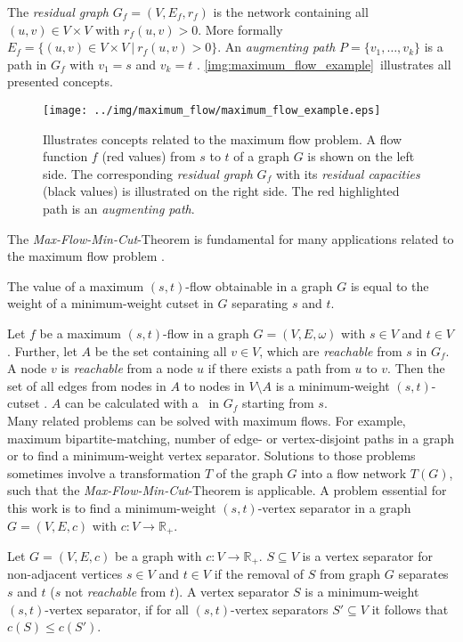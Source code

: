 The \emph{residual graph} $G_f = (V,E_f,r_f)$ is the network containing all $(u,v) \in V \times V$
with $r_f(u,v) > 0$. More formally $E_f = \{(u,v) \in V \times V\ |\ r_f(u,v) > 0\}$.
An \emph{augmenting path} $P = \{v_1,\ldots,v_k\}$ is a path in $G_f$ with $v_1 = s$ and 
$v_k = t$ \cite{edmonds1972theoretical}. \autoref{img:maximum_flow_example}~illustrates 
all presented concepts. \\
\begin{figure}
\centering
\texttt{[image: ../img/maximum\_flow/maximum\_flow\_example.eps]}
\caption{Illustrates concepts related to the maximum flow problem. A flow function $f$ 
(red values) from $s$ to $t$ of a graph $G$ is shown on the left side. The corresponding
\emph{residual graph} $G_f$ with its \emph{residual capacities} (black values) 
is illustrated on the right side. The red highlighted path is an \emph{augmenting path}.}
\label{img:maximum_flow_example}
\end{figure}
The \emph{Max-Flow-Min-Cut}-Theorem is fundamental for many applications related to the maximum
flow problem \cite{ford1956maximal}.

\begin{theorem}
The value of a maximum $(s,t)$-flow obtainable in a graph $G$ is equal to the 
weight of a minimum-weight cutset in $G$ separating $s$ and $t$.
\end{theorem}

Let $f$ be a maximum $(s,t)$-flow in a graph $G = (V,E,\omega)$ with $s \in V$ and $t \in V$. 
Further, let $A$ be the set containing all $v \in V$, which are \emph{reachable} from $s$
in $G_f$. A node $v$ is \emph{reachable} from a node $u$ if there exists a path from $u$
to $v$. Then the set of all edges from nodes in $A$ to nodes in $V \setminus A$
is a minimum-weight $(s,t)$-cutset \cite{ford2015flows}. $A$ can be calculated with a \BFS~in $G_f$ starting
from $s$. \\ 
Many related problems can be solved with maximum flows. For example, maximum bipartite-matching,
number of edge- or vertex-disjoint paths in a graph or to find a minimum-weight vertex
separator. Solutions to those problems sometimes involve a transformation $T$ of the graph $G$
into a flow network $T(G)$, such that the \emph{Max-Flow-Min-Cut}-Theorem is applicable. 
A problem essential for this work is to find a minimum-weight $(s,t)$-vertex separator
in a graph $G = (V,E,c)$ with $c: V \rightarrow \mathbb{R}_+$.

\begin{definition}
Let $G = (V,E,c)$ be a graph with $c: V \rightarrow \mathbb{R}_+$. $S \subseteq V$
is a vertex separator for non-adjacent vertices $s \in V$ and $t \in V$ if the
removal of $S$ from graph $G$ separates $s$ and $t$ ($s$ not \emph{reachable} from $t$).
A vertex separator $S$ is a minimum-weight $(s,t)$-vertex separator, if for all 
$(s,t)$-vertex separators $S' \subseteq V$ it follows that $c(S) \le c(S')$.
\end{definition}

